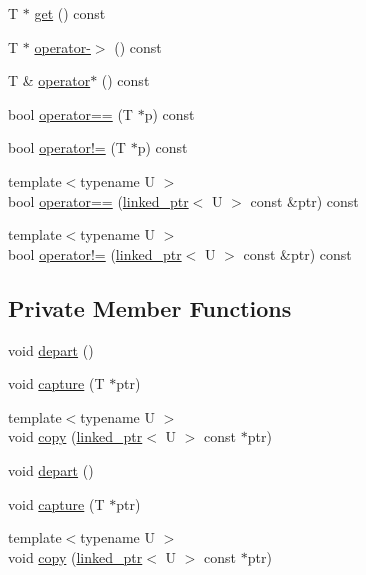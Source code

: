 \begin{DoxyCompactItemize}
\item 
\-T $\ast$ \hyperlink{classtesting_1_1internal_1_1linked__ptr_a07f851191ad3a7c5c1598ef14f710f96}{get} () const 
\item 
\-T $\ast$ \hyperlink{classtesting_1_1internal_1_1linked__ptr_ac0ddd007dfcfef3121f74d0665dfd0cd}{operator-\/$>$} () const 
\item 
\-T \& \hyperlink{classtesting_1_1internal_1_1linked__ptr_abcc36ef133f26e7e3145b785df23eb18}{operator$\ast$} () const 
\item 
bool \hyperlink{classtesting_1_1internal_1_1linked__ptr_a14ccaf9d85f9567edf3c1e3f1b625b3b}{operator==} (\-T $\ast$p) const 
\item 
bool \hyperlink{classtesting_1_1internal_1_1linked__ptr_ab14a2062bd0b5bb60371ca1dace31121}{operator!=} (\-T $\ast$p) const 
\item 
{\footnotesize template$<$typename U $>$ }\\bool \hyperlink{classtesting_1_1internal_1_1linked__ptr_a0713d3f03d2eb42910cf283b7cbb4990}{operator==} (\hyperlink{classtesting_1_1internal_1_1linked__ptr}{linked\-\_\-ptr}$<$ \-U $>$ const \&ptr) const 
\item 
{\footnotesize template$<$typename U $>$ }\\bool \hyperlink{classtesting_1_1internal_1_1linked__ptr_aed905b6347c4e4d62e5a80d4405febf2}{operator!=} (\hyperlink{classtesting_1_1internal_1_1linked__ptr}{linked\-\_\-ptr}$<$ \-U $>$ const \&ptr) const 
\end{DoxyCompactItemize}
\subsection*{\-Private \-Member \-Functions}
\begin{DoxyCompactItemize}
\item 
void \hyperlink{classtesting_1_1internal_1_1linked__ptr_a433500d816e6adc0d12d7a8dbe899dbd}{depart} ()
\item 
void \hyperlink{classtesting_1_1internal_1_1linked__ptr_a7fba6b43f9613d4244c02925f0695bca}{capture} (\-T $\ast$ptr)
\item 
{\footnotesize template$<$typename U $>$ }\\void \hyperlink{classtesting_1_1internal_1_1linked__ptr_a571281b9bfd78f126b42577a7d968f2b}{copy} (\hyperlink{classtesting_1_1internal_1_1linked__ptr}{linked\-\_\-ptr}$<$ \-U $>$ const $\ast$ptr)
\item 
void \hyperlink{classtesting_1_1internal_1_1linked__ptr_a433500d816e6adc0d12d7a8dbe899dbd}{depart} ()
\item 
void \hyperlink{classtesting_1_1internal_1_1linked__ptr_a7fba6b43f9613d4244c02925f0695bca}{capture} (\-T $\ast$ptr)
\item 
{\footnotesize template$<$typename U $>$ }\\void \hyperlink{classtesting_1_1internal_1_1linked__ptr_a571281b9bfd78f126b42577a7d968f2b}{copy} (\hyperlink{classtesting_1_1internal_1_1linked__ptr}{linked\-\_\-ptr}$<$ \-U $>$ const $\ast$ptr)
\end{DoxyCompactItemize}
